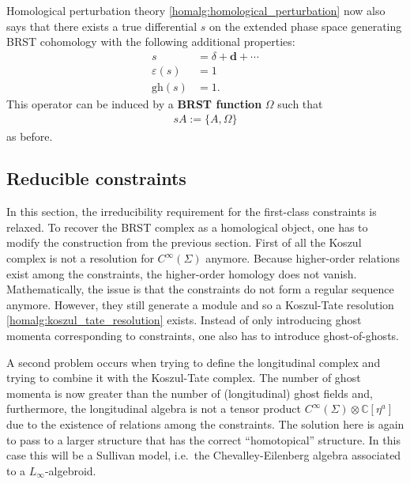     Homological perturbation theory \ref{homalg:homological_perturbation} now also says that there exists a true differential $s$ on the extended phase space  generating BRST cohomology with the following additional properties:
    \begin{align}
        s &= \delta + \mathbf{d} + \cdots\nonumber\\
        \varepsilon(s) &= 1\\
        \mathrm{gh}(s) &= 1.\nonumber
    \end{align}
    This operator can be induced by a \textbf{BRST function} $\Omega$ such that
    \begin{gather}
        sA := \{A,\Omega\}
    \end{gather}
    as before.

\subsection{Reducible constraints}

    In this section, the irreducibility requirement for the first-class constraints is relaxed. To recover the BRST complex as a homological object, one has to modify the construction from the previous section. First of all the Koszul complex is not a resolution for $C^\infty(\Sigma)$ anymore. Because higher-order relations exist among the constraints, the higher-order homology does not vanish. Mathematically, the issue is that the constraints do not form a regular sequence anymore. However, they still generate a module and so a Koszul-Tate resolution \ref{homalg:koszul_tate_resolution} exists. Instead of only introducing ghost momenta corresponding to constraints, one also has to introduce ghost-of-ghosts.

    A second problem occurs when trying to define the longitudinal complex and trying to combine it with the Koszul-Tate complex. The number of ghost momenta is now greater than the number of (longitudinal) ghost fields and, furthermore, the longitudinal algebra is not a tensor product $C^\infty(\Sigma)\otimes\mathbb{C}[\eta^a]$ due to the existence of relations among the constraints. The solution here is again to pass to a larger structure that has the correct ``homotopical'' structure. In this case this will be a Sullivan model, i.e.~the Chevalley-Eilenberg algebra associated to a $L_\infty$-algebroid.

